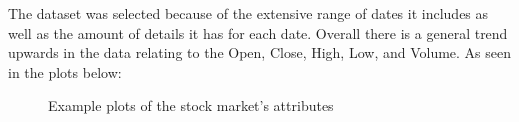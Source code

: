\documentclass{article}
\begin{document}
The dataset was selected because of the extensive range of dates it includes as well as the amount of details it has for each date. Overall there is a general trend upwards in the data relating to the Open, Close, High, Low, and Volume. As seen in the plots below:
\begin{figure}[h!]
    \qquad
    \caption{Example plots of the stock market's attributes}
    \label{fig:example}
\end{figure}
\end{document}
